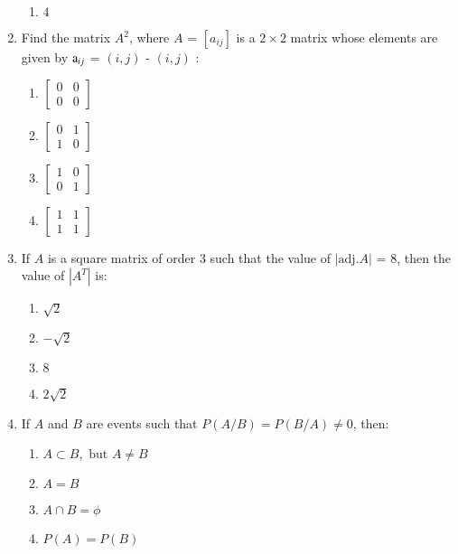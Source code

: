 \documentclass[12pt,-letter paper]{article}
\providecommand{\sbrak}[1]{\ensuremath{{}\left[#1\right]}}
\providecommand{\myvec}[1]{\ensuremath{\begin{bmatrix}#1\end{bmatrix}}}
\providecommand{\brak}[1]{\ensuremath{\left(#1\right)}}
\begin{document}
\begin{enumerate}
\begin{enumerate}[label={$\brak{\Alph*}$}]
      \item $4$                                                              \end{enumerate}                                                   
	\item Find the matrix $A^2$, where $A$ = $\sbrak{a_{ij}}$ is a        $2 \times 2 $ matrix whose elements are given by $\text a_{ij}$ = $\brak{i, j}$ - $\brak{i, j}$ :                            \begin{enumerate}[label={$\brak{\Alph*}$}]
                \item $\myvec{0 & 0 \\ 0 & 0}$
                \item $\myvec{0 & 1 \\ 1 & 0}$
                \item $\myvec{1 & 0 \\ 0 & 1}$
                \item $\myvec{1 & 1 \\ 1 & 1}$
                \end{enumerate}

    \item If $A$ is a square matrix of order $3$ such that the value of $ |\text{adj}.A| $ = $ 8 $, then the value of $ |A^T| $ is:
            \begin{enumerate}[label={$\brak{\Alph*}$}]
        \item $\sqrt{2}$
        \item $-\sqrt{2}$
        \item $8$
        \item $2\sqrt{2}$
    \end{enumerate}

    \item If $A$ and $B$ are events such that $P$\brak{A/B}$ = P$\brak{B/A}$ \neq 0$, then:
            \begin{enumerate}[label={$\brak{\Alph*}$}]
        \item $A \subset B, \text{ but } A \neq B$
        \item $A = B$
        \item $A \cap B = \phi$
        \item $P(A) = P(B)$
    \end{enumerate}
\end{enumerate}
\end{document}
